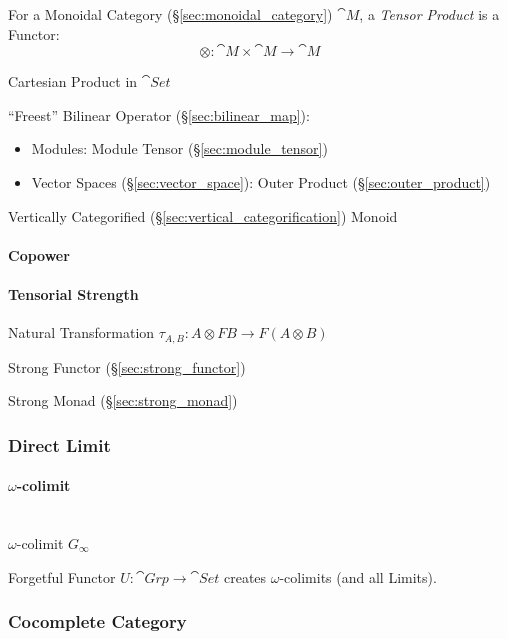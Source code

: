 For a Monoidal Category (\S\ref{sec:monoidal_category}) $\cat{M}$,
a \emph{Tensor Product} is a Functor:
\[
  \otimes : \cat{M} \times \cat{M} \rightarrow \cat{M}
\]

Cartesian Product in $\cat{Set}$

``Freest'' Bilinear Operator (\S\ref{sec:bilinear_map}):
\begin{itemize}
\item Modules: Module Tensor (\S\ref{sec:module_tensor})
\item Vector Spaces (\S\ref{sec:vector_space}): Outer Product
  (\S\ref{sec:outer_product})
\end{itemize}

Vertically Categorified (\S\ref{sec:vertical_categorification}) Monoid



\paragraph{Copower}\label{sec:copower}

\paragraph{Tensorial Strength}\label{sec:tensorial_strength}

Natural Transformation $\tau_{A,B} : A \otimes F B \rightarrow F (A
\otimes B)$

Strong Functor (\S\ref{sec:strong_functor})

Strong Monad (\S\ref{sec:strong_monad})



\subsubsection{Direct Limit}\label{sec:direct_limit}

\paragraph{$\omega$-colimit}\label{sec:omega_colimit}
\hfill \\

$\omega$-colimit $G_\infty$

Forgetful Functor $U : \cat{Grp} \rightarrow \cat{Set}$ creates
$\omega$-colimits (and all Limits). \cite{awodey06}



\subsubsection{Cocomplete Category}\label{sec:cocomplete_category}

